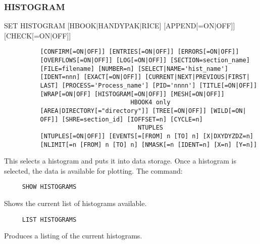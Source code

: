 \subsubsection{HISTOGRAM}
SET HISTOGRAM [HBOOK$|$HANDYPAK$|$RICE] [APPEND[=ON$|$OFF]] [CHECK[=ON$|$OFF]]
\begin{verbatim}
          [CONFIRM[=ON|OFF]] [ENTRIES[=ON|OFF]] [ERRORS[=ON|OFF]]
          [OVERFLOWS[=ON|OFF]] [LOG[=ON|OFF]] [SECTION=section_name]
          [FILE=filename] [NUMBER=n] [SELECT|NAME='hist_name']
          [IDENT=nnn] [EXACT[=ON|OFF]] [CURRENT|NEXT|PREVIOUS|FIRST|
          LAST] [PROCESS='Process_name'] [PID='nnnn'] [TITLE[=ON|OFF]]
          [WRAP[=ON|OFF] [HISTOGRAM[=ON|OFF]] [MESH[=ON|OFF]] 
                                   HBOOK4 only
          [AREA|DIRECTORY[="directory"]] [TREE[=ON|OFF]] [WILD[=ON|
          OFF]] [SHRE=section_id] [IOFFSET=n] [CYCLE=n] 
                                     NTUPLES
          [NTUPLES[=ON|OFF]] [EVENTS[=[FROM] n [TO] n] [X|DXYDYZDZ=n]
          [NLIMIT[=n [FROM] n [TO] n] [NMASK[=n [IDENT=n] [X=n] [Y=n]] 
\end{verbatim}
This  selects  a  histogram  and  puts  it  into  data storage.  Once a
histogram is  selected,  the  data  is  available  for  plotting.   The
command:  
\begin{verbatim}
     SHOW HISTOGRAMS 
\end{verbatim}
Shows the current list of histograms available.  
\begin{verbatim}
     LIST HISTOGRAMS 
\end{verbatim}
Produces a listing of the current histograms.  
